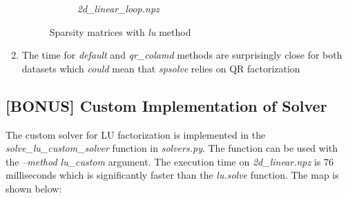 \documentclass[12pt, a4paper]{article}
\begin{document}
\begin{enumerate}
\begin{figure}[H]
\begin{subfigure}[b]{0.45\textwidth}
      \caption{\textit{2d\_linear\_loop.npz}}
    \end{subfigure}
    \caption{Sparsity matrices with \textit{lu} method}
  \end{figure}
  
  \item The time for \textit{default} and \textit{qr\_colamd} methods are surprisingly close for both datasets which \textit{could} mean that \textit{spsolve} relies on QR factorization
\end{enumerate}
\subsection{[BONUS] Custom Implementation of Solver}
The custom solver for LU factorization is implemented in the \textit{solve\_lu\_custom\_solver} function in \textit{solvers.py}. The function can be used with the \textit{--method lu\_custom} argument. The execution time on \textit{2d\_linear.npz} is 76 milliseconds which is significantly faster than the \textit{lu.solve} function. The map is shown below:
\end{document}
